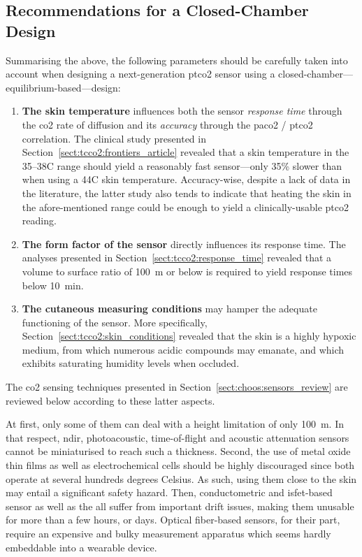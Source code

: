 \subsection{Recommendations for a Closed-Chamber Design}

Summarising the above, the following parameters should be carefully taken into account when designing a next-generation \gls{ptco2} sensor using a closed-chamber---\aka{} equilibrium-based---design:
\begin{enumerate}
	\item \textbf{The skin temperature} influences both the sensor \emph{response time} through the \gls{co2} rate of diffusion and its \emph{accuracy} through the \gls{paco2} / \gls{ptco2} correlation. The clinical study presented in Section~\ref{sect:tcco2:frontiers_article} revealed that a skin temperature in the 35--38{\degree}C range should yield a reasonably fast sensor---only 35\% slower than when using a 44{\degree}C skin temperature. Accuracy-wise, despite a lack of data in the literature, the latter study also tends to indicate that heating the skin in the afore-mentioned range could be enough to yield a clinically-usable \gls{ptco2} reading.
	\item \textbf{The form factor of the sensor} directly influences its response time. The analyses presented in Section~\ref{sect:tcco2:response_time} revealed that a volume to surface ratio of 100~\textmu{}m or below is required to yield response times below 10~min.
	\item \textbf{The cutaneous measuring conditions} may hamper the adequate functioning of the sensor. More specifically, Section~\ref{sect:tcco2:skin_conditions} revealed that the skin is a highly hypoxic medium, from which numerous acidic compounds may emanate, and which exhibits saturating humidity levels when occluded.
\end{enumerate}
The \gls{co2} sensing techniques presented in Section~\ref{sect:choos:sensors_review} are reviewed below according to these latter aspects.

At first, only some of them can deal with a height limitation of only 100~\textmu{}m. In that respect, \gls{ndir}, photoacoustic, time-of-flight and acoustic attenuation sensors cannot be miniaturised to reach such a thickness. Second, the use of metal oxide thin films as well as electrochemical cells should be highly discouraged since both operate at several hundreds degrees Celsius. As such, using them close to the skin may entail a significant safety hazard. Then, conductometric and \gls{isfet}-based sensor as well as the \ssel{} all suffer from important drift issues, making them unusable for more than a few hours, or days. Optical fiber-based sensors, for their part, require an expensive and bulky measurement apparatus which seems hardly embeddable into a wearable device.

